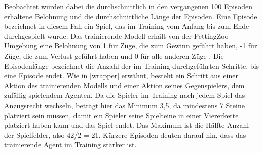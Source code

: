 
Beobachtet wurden dabei die durchschnittlich in den vergangenen 100 Episoden erhaltene Belohnung und die durchschnittliche Länge der Episoden. Eine Episode bezeichnet in diesem Fall ein Spiel, das im Training vom Anfang bis zum Ende durchgespielt wurde. Das trainierende Modell erhält von der PettingZoo-Umgebung eine Belohnung von 1 für Züge, die zum Gewinn geführt haben, -1 für Züge, die zum Verlust geführt haben und 0 für alle anderen Züge \cite{Farama.2025}. Die Episodenĺänge bezeichnet die Anzahl der im Training durchgeführten Schritte, bis eine Episode endet. Wie in \ref{wrapper} erwähnt, besteht ein Schritt aus einer Aktion des trainierenden Modells und einer Aktion seines Gegenspielers, dem zufällig spielendem Agenten. Da die Spieler im Training nach jedem Spiel das Anzugsrecht wechseln, beträgt hier das Minimum 3,5, da mindestens 7 Steine platziert sein müssen, damit ein Spieler seine Spielteine in einer Viererkette platziert haben kann und das Spiel endet. Das Maximum ist die Hälfte Anzahl der Spielfelder, also 42/2 = 21. Kürzere Episoden deuten darauf hin, dass das trainierende Agent im Training stärker ist.

